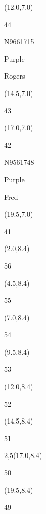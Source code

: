 \documentclass[a4paper]{article}
\newcommand{\myseat}[4]{%
\vspace{-0.1cm} \hspace{-0.5cm}
\parbox[t][2.2cm][t]{3.5cm}{%
\small #1 %
\begin{description}
\vspace{-0.1cm}
\item [ID:] #2
\vspace{-0.1cm}
\item [Team:] #3 \normalsize
\vspace{-0.1cm}
\item \normalsize #4
\vspace{-0.1cm}
\end{description}
}
}
\begin{document}
\begin{textblock}{2.5}(12.0,7.0)
\myseat{44}{N9661715}{Purple}{Rogers}
\end{textblock}

\begin{textblock}{2.5}(14.5,7.0)
\textblockcolor{}
\myseat{43}{}{}{}
\end{textblock}

\begin{textblock}{2.5}(17.0,7.0)
\myseat{42}{N9561748}{Purple}{Fred}
\end{textblock}

\begin{textblock}{2.5}(19.5,7.0)
\textblockcolor{}
\myseat{41}{}{}{}
\end{textblock}


\begin{textblock}{2.5}(2.0,8.4)
\textblockcolor{}
\myseat{56}{}{}{}
\end{textblock}

\begin{textblock}{2.5}(4.5,8.4)
\textblockcolor{}
\myseat{55}{}{}{}
\end{textblock}

\begin{textblock}{2.5}(7.0,8.4)
\textblockcolor{}
\myseat{54}{}{}{}
\end{textblock}

\begin{textblock}{2.5}(9.5,8.4)
\textblockcolor{}
\myseat{53}{}{}{}
\end{textblock}

\begin{textblock}{2.5}(12.0,8.4)
\textblockcolor{}
\myseat{52}{}{}{}
\end{textblock}

\begin{textblock}{2.5}(14.5,8.4)
\textblockcolor{}
\myseat{51}{}{}{}
\end{textblock}

\begin{textblock}{2,5}(17.0,8.4)
\textblockcolor{}
\myseat{50}{}{}{}
\end{textblock}

\begin{textblock}{2.5}(19.5,8.4)
\textblockcolor{}
\myseat{49}{}{}{}
\end{textblock}
\end{document}
